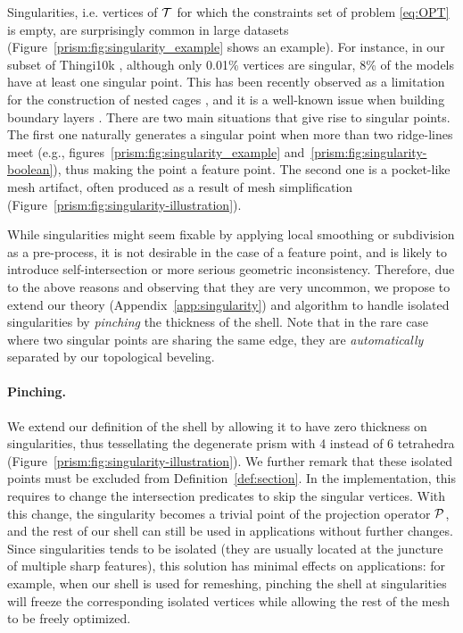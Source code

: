 Singularities, i.e. vertices of $\T$ for which the constraints set of problem \eqref{eq:OPT} is empty, are surprisingly common in large datasets (Figure~\ref{prism:fig:singularity_example} shows an example). For instance, in our subset of Thingi10k \cite{zhou2016thingi10k}, although only 0.01\% vertices are singular,  8\% of the models have at least one singular point. This has been recently observed as a limitation for the construction of nested cages \cite[Appendix A]{sacht2015nested}, and it is a well-known issue when building boundary layers \cite{aubry2015most,aubry2017boundary,garimella2000boundary}.
%
There are two main situations that give rise to singular points. 
The first one naturally generates a singular point when more than two ridge-lines meet (e.g., figures~\ref{prism:fig:singularity_example} and~\ref{prism:fig:singularity-boolean}), thus making the point a feature point. 
The second one is a pocket-like mesh artifact, often produced as a result of mesh simplification (Figure~\ref{prism:fig:singularity-illustration}).

While singularities might seem fixable by applying local smoothing or subdivision as a pre-process, it is not desirable in the case of a feature point, and is likely to introduce self-intersection or more serious geometric inconsistency.
Therefore, due to the above reasons and observing that they are very uncommon, we propose to extend our theory (Appendix~\ref{app:singularity}) and algorithm to handle isolated singularities  by \emph{pinching} the thickness of the shell. Note that in the rare case where two singular points are sharing the same edge, they are \emph{automatically} separated by our topological beveling.

\paragraph{Pinching.} 
We extend our definition of the shell by allowing it to have zero thickness on singularities, thus tessellating the degenerate prism with 4 instead of 6 tetrahedra (Figure~\ref{prism:fig:singularity-illustration}). We further remark that these isolated points must be excluded from Definition~\ref{def:section}. In the implementation, this requires to change the intersection predicates to skip the singular vertices.
With this change, the singularity becomes a trivial point of the projection operator $\P$,
and the rest of our shell can still be used in applications without further changes. Since singularities tends to be isolated (they are usually located at the juncture of multiple sharp features), this solution has minimal effects on applications: for example, when our shell is used for remeshing, pinching the shell at singularities will freeze the corresponding isolated vertices while allowing the rest of the mesh to be freely optimized.

